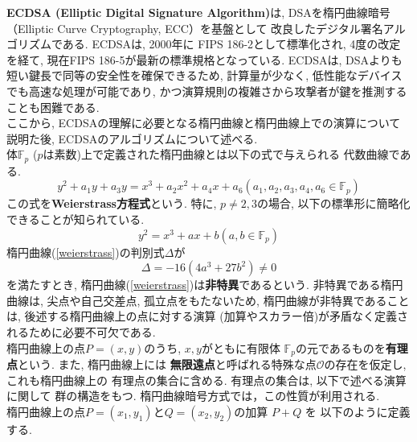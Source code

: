 \indent \textbf{ECDSA (Elliptic Digital Signature Algorithm)}は, 
DSA\cite{fips186-5}を楕円曲線暗号（Elliptic Curve Cryptography, ECC）を基盤として
改良したデジタル署名アルゴリズムである.
ECDSAは, 2000年に FIPS 186-2として標準化され, 
4度の改定を経て, 現在FIPS 186-5\cite{fips186-5}が最新の標準規格となっている. 
ECDSAは, DSAよりも短い鍵長で同等の安全性を確保できるため, 
計算量が少なく, 低性能なデバイスでも高速な処理が可能であり, 
かつ演算規則の複雑さから攻撃者が鍵を推測することも困難である. \\
\indent ここから, ECDSAの理解に必要となる楕円曲線と楕円曲線上での演算について
説明た後, ECDSAのアルゴリズムについて述べる.\\
\indent 体$\mathbb{F}_p$ ($p$は素数)上で定義された楕円曲線とは以下の式で与えられる
代数曲線である.
\[
  y^2+a_1y+a_3y=x^3+a_2x^2+a_4x+a_6　　(a_1,a_2,a_3,a_4,a_6\in\mathbb{F}_p)
\]
この式を\textbf{Weierstrass方程式}という\cite{安田}. 
特に, $p\neq 2,3$の場合, 以下の標準形に簡略化できることが知られている. 
\begin{equation}\label{weierstrass}
  y^2=x^3+ax+b　　(a,b\in\mathbb{F}_p)
\end{equation}
\indent 楕円曲線(\ref{weierstrass})の判別式$\Delta$が
\[
  \Delta=-16(4a^3+27b^2)\neq 0
\]
を満たすとき, 楕円曲線(\ref{weierstrass})は\textbf{非特異}であるという. 
非特異である楕円曲線は, 尖点や自己交差点, 孤立点をもたないため, 
楕円曲線が非特異であることは, 後述する楕円曲線上の点に対する演算
(加算やスカラー倍)が矛盾なく定義されるために必要不可欠である.\\
\indent 楕円曲線上の点$P=(x,y)$のうち, $x,y$がともに有限体
$\mathbb{F}_p$の元であるものを\textbf{有理点}という. また, 楕円曲線上には
\textbf{無限遠点}と呼ばれる特殊な点$\mathcal{O}$の存在を仮定し, これも楕円曲線上の
有理点の集合に含める. 有理点の集合は, 以下で述べる演算に関して
群の構造をもつ. 楕円曲線暗号方式では，この性質が利用される.\\
\indent 楕円曲線上の点$P=(x_1,y_1)$と$Q=(x_2,y_2)$の加算 $P+Q$ を
以下のように定義する.
